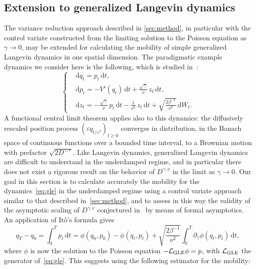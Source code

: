 \documentclass[11pt,a4paper]{article}
\renewcommand{\d}{\mathrm d}
\theoremstyle{plain}
\numberwithin{equation}{section}
\renewcommand{\geq}{\geqslant}
\begin{document}
\subsection{Extension to generalized Langevin dynamics}%
\label{sub:generalization_to_generalized_langevin_dynamics}
The variance reduction approach described in \cref{sec:method},
in particular with the control variate constructed from the limiting solution to the Poisson equation as $\gamma \to 0$,
may be extended for calculating the mobility of simple generalized Langevin dynamics in one spatial dimension.
The paradigmatic example dynamics we consider here is the following,
which is studied in~\cite{MR2793823,GPGSUV21}:
\begin{equation}
\label{eq:gle}
\left\{
  \begin{aligned}
      & \d q_t = p_t \, \d t, \\
      & \d p_t = - V'(q_t) \, \d t + \frac{\sqrt{\gamma}}{\nu} \, z_t \, \d t, \\
      & \d z_t = - \frac{\sqrt{\gamma}}{\nu} \, p_t  \, \d t
       -   \frac{1}{\nu^2} \, z_t \, \d t + \sqrt{\frac{2\beta^{-1}}{\nu^2}} \, \d W_t.
  \end{aligned}
\right.
\end{equation}
A functional central limit theorem applies also to this dynamics:
the diffusively rescaled position process $(\varepsilon q_{t/\varepsilon^2})_{t \geq 0}$ converges in distribution,
in the Banach space of continuous functions over a bounded time interval,
to a Brownian motion with prefactor $\sqrt{2 D^{\gamma, \nu}}$.
Like Langevin dynamics, generalized Langevin dynamics are difficult to understand in the underdamped regime,
and in particular there does not exist a rigorous result on the behavior of $D^{\gamma, \nu}$ in the limit as $\gamma \to 0$.
Our goal in this section is to calculate accurately the mobility for the dynamics~\eqref{eq:gle} in the underdamped regime
using a control variate approach similar to that described in~\cref{sec:method},
and to assess in this way the validity of the asymptotic scaling of $D^{\gamma,\nu}$ conjectured in~\cite{GPGSUV21} by means of formal asymptotics.
An application of It\^o's formula gives
\[
    q_T - q_0 = \int_{0}^{T} p_t \, \d t
    = \phi(q_0, p_0) - \phi(q_t, p_t) + \sqrt{\frac{2 \beta^{-1}}{\nu^2}} \int_{0}^{T} \partial_z \phi(q_t, p_t) \, \d t,
\]
where $\phi$ is now the solution to the Poisson equation $- \mathcal L_{\rm GLE} \phi = p$,
with $\mathcal L_{\rm GLE}$ the generator of~\eqref{eq:gle}.
This suggests using the following estimator for the mobility:
\end{document}
